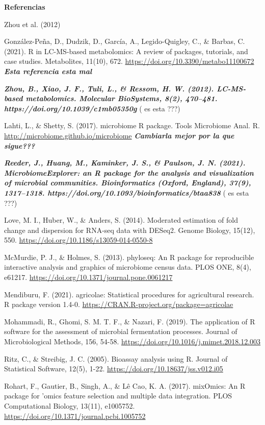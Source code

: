 \documentclass[
  letterpaper,
  DIV=11,
  numbers=noendperiod]{scrreprt}
\begin{document}
\textbf{Referencias}

Zhou et al. (2012)

González-Peña, D., Dudzik, D., García, A., Legido-Quigley, C., \&
Barbas, C. (2021). R in LC-MS-based metabolomics: A review of packages,
tutorials, and case studies. Metabolites, 11(10), 672.
\url{https://doi.org/10.3390/metabo11100672} \textbf{\emph{Esta
referencia esta mal}}

\textbf{\emph{Zhou, B., Xiao, J. F., Tuli, L., \& Ressom, H. W. (2012).
LC-MS-based metabolomics. Molecular BioSystems, 8(2), 470--481.
https://doi.org/10.1039/c1mb05350g}} ( es esta ???)

Lahti, L., \& Shetty, S. (2017). microbiome R package. Tools Microbiome
Anal. R. \url{http://microbiome.github.io/microbiome}
\textbf{\emph{Cambiarla mejor por la que sigue???}}

\textbf{\emph{Reeder, J., Huang, M., Kaminker, J. S., \& Paulson, J. N.
(2021). MicrobiomeExplorer: an R package for the analysis and
visualization of microbial communities. Bioinformatics (Oxford,
England), 37(9), 1317--1318.
https://doi.org/10.1093/bioinformatics/btaa838}} ( es esta ???)

Love, M. I., Huber, W., \& Anders, S. (2014). Moderated estimation of
fold change and dispersion for RNA-seq data with DESeq2. Genome Biology,
15(12), 550. \url{https://doi.org/10.1186/s13059-014-0550-8}

McMurdie, P. J., \& Holmes, S. (2013). phyloseq: An R package for
reproducible interactive analysis and graphics of microbiome census
data. PLOS ONE, 8(4), e61217.
\url{https://doi.org/10.1371/journal.pone.0061217}

Mendiburu, F. (2021). agricolae: Statistical procedures for agricultural
research. R package version 1.4-0.
\url{https://CRAN.R-project.org/package=agricolae}

Mohammadi, R., Ghomi, S. M. T. F., \& Nazari, F. (2019). The application
of R software for the assessment of microbial fermentation processes.
Journal of Microbiological Methods, 156, 54-58.
\url{https://doi.org/10.1016/j.mimet.2018.12.003}

Ritz, C., \& Streibig, J. C. (2005). Bioassay analysis using R. Journal
of Statistical Software, 12(5), 1-22.
\url{https://doi.org/10.18637/jss.v012.i05}

Rohart, F., Gautier, B., Singh, A., \& Lê Cao, K. A. (2017). mixOmics:
An R package for 'omics feature selection and multiple data integration.
PLOS Computational Biology, 13(11), e1005752.
\url{https://doi.org/10.1371/journal.pcbi.1005752}
\end{document}
